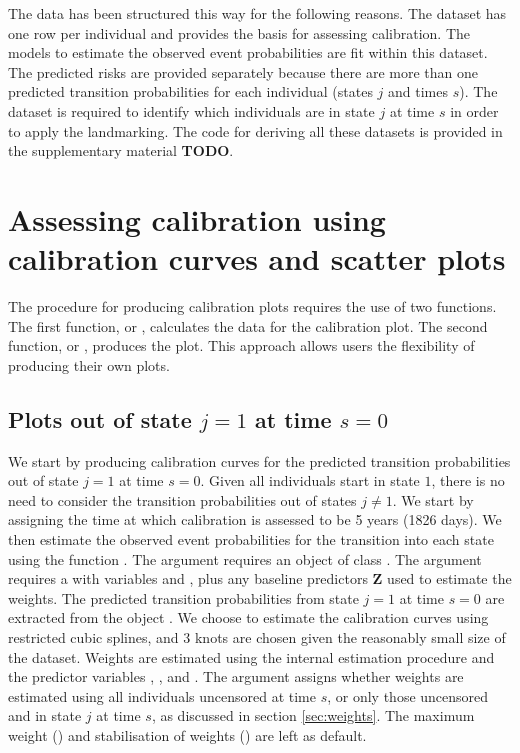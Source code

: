 \documentclass[nojss]{jss}
\begin{document}
The data has been structured this way for the following reasons. The  dataset has one row per individual and provides the basis for assessing calibration. The models to estimate the observed event probabilities are fit within this dataset. The predicted risks are provided separately because there are more than one predicted transition probabilities for each individual (states $j$ and times $s$). The  dataset is required to identify which individuals are in state $j$ at time $s$ in order to apply the landmarking. The code for deriving all these datasets is provided in the supplementary material \textbf{TODO}.

\section[Assessing calibration using calibration curves and scatter plots]{Assessing calibration using calibration curves and scatter plots} \label{sec:calibplots}

The procedure for producing calibration plots requires the use of two functions. The first function,  or , calculates the data for the calibration plot. The second function,  or , produces the plot. This approach allows users the flexibility of producing their own plots.

\subsection[Plots out of state j = 1 at time s = 0]{Plots out of state $j = 1$ at time $s = 0$} \label{sec:plotsj1s0}

We start by producing calibration curves for the predicted transition probabilities out of state $j = 1$ at time $s = 0$. Given all individuals start in state $1$, there is no need to consider the transition probabilities out of states $j \neq 1$. We start by assigning the time at which calibration is assessed to be 5 years (1826 days). We then estimate the observed event probabilities for the transition into each state using the function . The  argument requires an object of class . The  argument requires a  with variables  and , plus any baseline predictors $\textbf{Z}$ used to estimate the weights. The predicted transition probabilities from state $j = 1$ at time $s = 0$ are extracted from the object . We choose to estimate the calibration curves using restricted cubic splines, and 3 knots are chosen given the reasonably small size of the dataset. Weights are estimated using the internal estimation procedure and the predictor variables , ,  and . The  argument assigns whether weights are estimated using all individuals uncensored at time $s$, or only those uncensored and in state $j$ at time $s$, as discussed in section \ref{sec:weights}. The maximum weight () and stabilisation of weights () are left as default.
\end{document}
